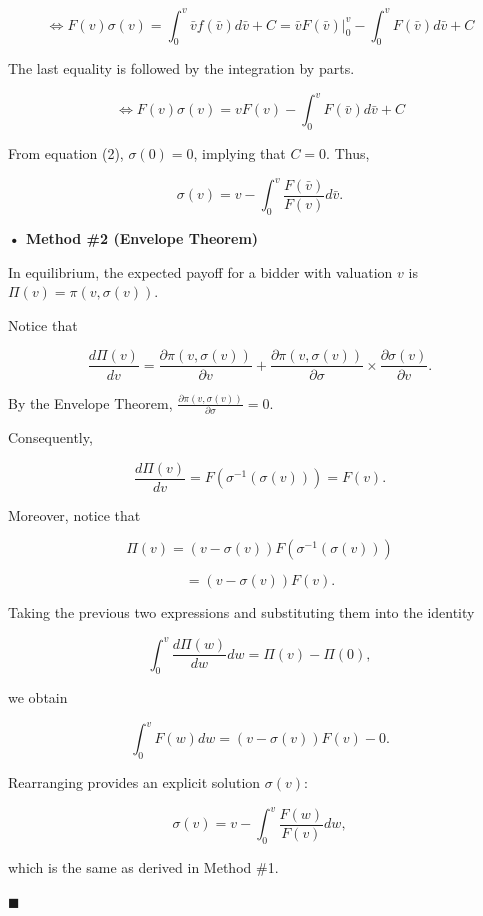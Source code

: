 \documentclass[12pt, oneside]{article}
\begin{document}
\[
\Leftrightarrow F(v) \sigma(v) = \int_0^v \bar{v} f(\bar{v}) d\bar{v} + C = \bar{v} F(\bar{v}) \Big|_0^v - \int_0^v F(\bar{v}) d\bar{v} + C
\]

The last equality is followed by the integration by parts.

\[
\Leftrightarrow F(v) \sigma(v) = v F(v) - \int_0^v F(\bar{v}) d\bar{v} + C
\]

From equation (2), \( \sigma(0) = 0 \), implying that \( C = 0 \). Thus,

\[
\sigma(v) = v - \int_0^v \frac{F(\bar{v})}{F(v)} d\bar{v}.
\]

\textbf{• Method \#2 (Envelope Theorem)}

In equilibrium, the expected payoff for a bidder with valuation \( v \) is \( \Pi(v) = \pi(v, \sigma(v)) \).

Notice that

\[
\frac{d \Pi(v)}{dv} = \frac{\partial \pi(v, \sigma(v))}{\partial v} + \frac{\partial \pi(v, \sigma(v))}{\partial \sigma} \times \frac{\partial \sigma(v)}{\partial v}.
\]

By the Envelope Theorem, \( \frac{\partial \pi(v, \sigma(v))}{\partial \sigma} = 0 \).

Consequently,

\[
\frac{d \Pi(v)}{dv} = F(\sigma^{-1}(\sigma(v))) = F(v).
\]

Moreover, notice that

\[
\Pi(v) = (v - \sigma(v)) F(\sigma^{-1}(\sigma(v)))
\]

\[
= (v - \sigma(v)) F(v).
\]

Taking the previous two expressions and substituting them into the identity

\[
\int_0^v \frac{d \Pi(w)}{dw} dw = \Pi(v) - \Pi(0),
\]

we obtain

\[
\int_0^v F(w) dw = (v - \sigma(v)) F(v) - 0.
\]

Rearranging provides an explicit solution \( \sigma(v) \):

\[
\sigma(v) = v - \int_0^v \frac{F(w)}{F(v)} dw,
\]

which is the same as derived in Method \#1.

\(\blacksquare\)
\end{document}
